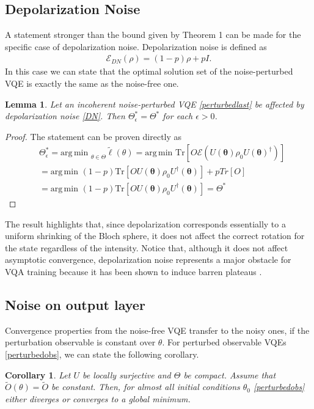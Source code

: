\documentclass[letterpaper, 10 pt]{IEEEtran}  %
\newcommand{\Tr}{\mathrm{Tr}}
\newcommand{\argmin}{\mathrm{arg\,min\,\,}}
\newtheorem{corollary}{Corollary}
\newtheorem{lemma}{Lemma}
\begin{document}
\subsection{Depolarization Noise} A statement stronger than the bound given by Theorem 1 can be made for the specific case of depolarization noise.
Depolarization noise is defined as 
\begin{align}
   \mathcal{E}_{DN}(\rho)=(1-p)\rho + {p}I. \label{DN}
\end{align} 
In this case we can state that the optimal solution set of the noise-perturbed VQE is exactly the same as the noise-free one. 
\begin{lemma}
   Let an incoherent noise-perturbed VQE \eqref{perturbedlast} be affected by depolarization noise \eqref{DN}.
   Then $\Theta^*_\epsilon=\Theta^*$ for each $\epsilon>0$.
\end{lemma}

\begin{proof}
   The statement can be proven directly as
   \begin{align}
   & \Theta^*_\epsilon=\argmin_{\theta \in \Theta} \tilde{\ell} (\theta) = \argmin\Tr[O \mathcal{E}(U(\mathbf{\theta}) \rho_0 U(\mathbf{\theta})^\dagger)] \nonumber \\ 
   &=\argmin  (1-p) \Tr[O U(\mathbf{\theta})\rho_0 U^\dagger(\mathbf{\theta})] + p Tr[O] \nonumber \\
   &= \argmin  (1-p) \Tr[O U(\mathbf{\theta})\rho_0 U^\dagger(\mathbf{\theta})] = \Theta^* 
\end{align}
\end{proof}
The result highlights that, since depolarization corresponds essentially to a uniform shrinking of the Bloch sphere, it does not affect the correct rotation for the state regardless of the intensity. 
Notice that, although it does not affect asymptotic convergence, depolarization noise represents a major obstacle for VQA training
because it has been shown to induce barren plateaus \cite{Wang2021}. 

\subsection{Noise on output layer} 
Convergence properties from the noise-free VQE transfer to the noisy ones, 
if the perturbation observable is constant over $\theta$.
For perturbed observable VQEs \eqref{perturbedobs}, we can state the following corollary.
\begin{corollary}
   Let $U$ be locally surjective and $\Theta$ be compact. 
   Assume that $\tilde{O}(\theta)=\tilde{O}$ be constant. Then, for almost all initial conditions $\theta_0$ \eqref{perturbedobs} either diverges
   or converges to a global minimum.
\end{corollary}
\end{document}
